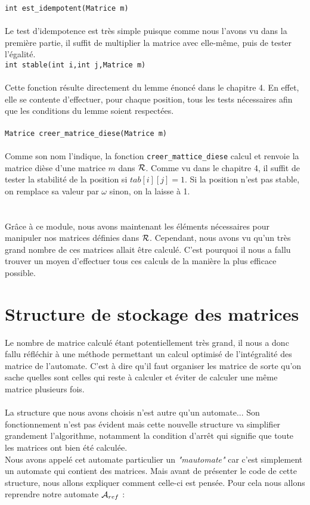 \documentclass{report}
\begin{document}
\verb?int est_idempotent(Matrice m)?\\\\
Le test d'idempotence est très simple puisque comme nous l'avons vu dans la première partie, il suffit de multiplier la matrice avec elle-même, puis de tester l'égalité.\\

\verb?int stable(int i,int j,Matrice m)?\\\\
Cette fonction résulte directement du lemme énoncé dans le chapitre 4. En effet, elle se contente d'effectuer, pour chaque position, tous les tests nécessaires afin que les conditions du lemme soient respectées.\\\\

\verb?Matrice creer_matrice_diese(Matrice m)?\\\\
Comme son nom l'indique, la fonction \verb?creer_mattice_diese? calcul et renvoie la matrice dièse d'une matrice $m$ dans $\mathcal{R}$. Comme vu dans le chapitre 4, il suffit de tester la stabilité de la position si $tab[i][j] = 1$. Si la position n'est pas stable, on remplace sa valeur par $\omega$ sinon, on la laisse à 1.\\\\\\

Grâce à ce module, nous avons maintenant les éléments nécessaires pour manipuler nos matrices définies dans $\mathcal{R}$. Cependant, nous avons vu qu'un très grand nombre de ces matrices allait être calculé. C'est pourquoi il nous a fallu trouver un moyen d'effectuer tous ces calculs de la manière la plus efficace possible.

\chapter{Structure de stockage des matrices}


Le nombre de matrice calculé étant potentiellement très grand, il nous a donc fallu réfléchir à une méthode permettant un calcul optimisé de l'intégralité des matrice de l'automate. C'est à dire qu'il faut organiser les matrice de sorte qu'on sache quelles sont celles qui reste à calculer et éviter de calculer une même matrice plusieurs fois. \\\\
La structure que nous avons choisis n'est autre qu'un automate... Son fonctionnement n'est pas évident mais cette nouvelle structure va simplifier grandement l'algorithme, notamment la condition d'arrêt qui signifie que toute les matrices ont bien été calculée.\\
Nous avons appelé cet automate particulier un \textit{"mautomate"} car c'est simplement un automate qui contient des matrices. Mais avant de présenter le code de cette structure, nous allons expliquer comment celle-ci est pensée. Pour cela nous allons reprendre notre automate $\mathcal{A}_{ref}$ :\\\\
\end{document}
